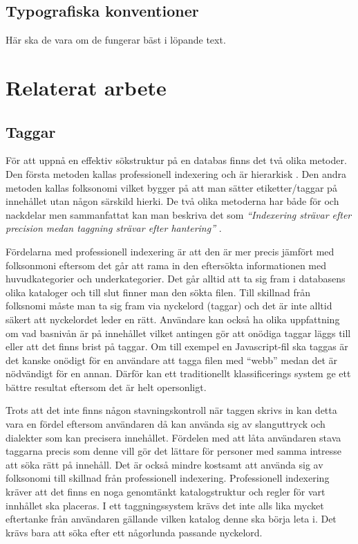 \documentclass[a4paper,12pt,oneside,final]{extbook}
\begin{document}
\section{Typografiska konventioner}
Här ska de vara om de fungerar bäst i löpande text.

\chapter{Relaterat arbete}

\section{Taggar}
För att uppnå en effektiv sökstruktur på en databas finns det två olika metoder. Den första metoden kallas professionell indexering och är hierarkisk \cite{tagging}. Den andra metoden kallas folksonomi vilket bygger på att man sätter etiketter/taggar på innehållet utan någon särskild hierki\cite{tagging}. De två olika metoderna har både för och nackdelar men sammanfattat kan man beskriva det som \textit{“Indexering strävar efter precision medan taggning strävar efter hantering”} \cite{tagging}.

Fördelarna med professionell indexering är att den är mer precis jämfört med folksonmoni eftersom det går att rama in den eftersökta informationen med huvudkategorier och underkategorier. Det går alltid att ta sig fram i databasens olika kataloger och till slut finner man den sökta filen. Till skillnad från folksnomi måste man ta sig fram via nyckelord (taggar) och det är inte alltid säkert att nyckelordet leder en rätt. Användare kan också ha olika uppfattning om vad basnivån är på innehållet vilket antingen gör att onödiga taggar läggs till eller att det finns brist på taggar. Om till exempel en Javascript-fil ska taggas är det kanske onödigt för en användare att tagga filen med “webb” medan det är nödvändigt för en annan. Därför kan ett traditionellt klassificerings system ge ett bättre resultat eftersom det är helt opersonligt. 

Trots att det inte finns någon stavningskontroll när taggen skrivs in kan detta vara en fördel eftersom användaren då kan använda sig av slanguttryck och dialekter som kan precisera innehållet. Fördelen med att låta användaren stava taggarna precis som denne vill gör det lättare för personer med samma intresse att söka rätt på innehåll. Det är också mindre kostsamt att använda sig av folksonomi till skillnad från professionell indexering. Professionell indexering kräver att det finns en noga genomtänkt katalogstruktur och regler för vart innhållet ska placeras. I ett taggningssystem krävs det inte alls lika mycket eftertanke från användaren gällande vilken katalog denne ska börja leta i. Det krävs bara att söka efter ett någorlunda passande nyckelord.
\end{document}

